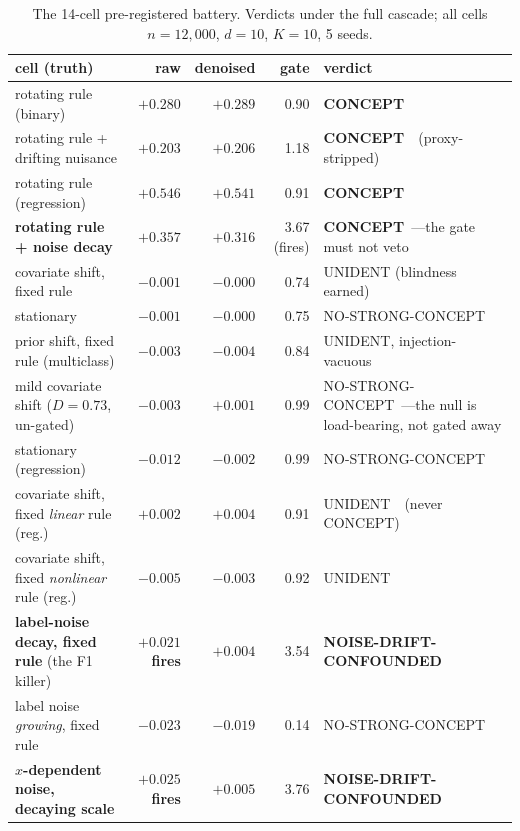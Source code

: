 \documentclass[10pt]{article} %
\newcommand{\yes}{\checkmark}
\begin{document}
\begin{table}[t]
\caption{The 14-cell pre-registered battery. Verdicts under the full cascade; all cells
$n = 12{,}000$, $d = 10$, $K = 10$, 5 seeds.}
\label{tab:battery}
\centering
\footnotesize
\setlength{\tabcolsep}{4pt}
\begin{tabular}{@{}>{\raggedright\arraybackslash}p{2.0in}rrr>{\raggedright\arraybackslash}p{2.35in}@{}}
\toprule
cell (truth) & raw & denoised & gate & verdict \\
\midrule
rotating rule (binary) & $+0.280$ & $+0.289$ & 0.90 & \textbf{CONCEPT}~\yes \\
rotating rule + drifting nuisance & $+0.203$ & $+0.206$ & 1.18 & \textbf{CONCEPT}~\yes\ (proxy-stripped) \\
rotating rule (regression) & $+0.546$ & $+0.541$ & 0.91 & \textbf{CONCEPT}~\yes \\
\textbf{rotating rule + noise decay} & $+0.357$ & $\boldsymbol{+0.316}$ & 3.67 (fires) & \textbf{CONCEPT}~\yes---the gate must not veto \\
covariate shift, fixed rule & $-0.001$ & $-0.000$ & 0.74 & UNIDENT (blindness earned)~\yes \\
stationary & $-0.001$ & $-0.000$ & 0.75 & NO-STRONG-CONCEPT~\yes \\
prior shift, fixed rule (multiclass) & $-0.003$ & $-0.004$ & 0.84 & UNIDENT, injection-vacuous~\yes \\
mild covariate shift ($D = 0.73$, un-gated) & $-0.003$ & $+0.001$ & 0.99 & NO-STRONG-CONCEPT~\yes---the null is load-bearing, not gated away \\
stationary (regression) & $-0.012$ & $-0.002$ & 0.99 & NO-STRONG-CONCEPT~\yes \\
covariate shift, fixed \emph{linear} rule (reg.) & $+0.002$ & $+0.004$ & 0.91 & UNIDENT~\yes\ (never CONCEPT) \\
covariate shift, fixed \emph{nonlinear} rule (reg.) & $-0.005$ & $-0.003$ & 0.92 & UNIDENT~\yes \\
\textbf{label-noise decay, fixed rule} (the F1 killer) & $\boldsymbol{+0.021}$ \textbf{fires} & $+0.004$ & 3.54 & \textbf{NOISE-DRIFT-CONFOUNDED}~\yes \\
label noise \emph{growing}, fixed rule & $-0.023$ & $-0.019$ & 0.14 & NO-STRONG-CONCEPT~\yes \\
\textbf{$x$-dependent noise, decaying scale} & $\boldsymbol{+0.025}$ \textbf{fires} & $+0.005$ & 3.76 & \textbf{NOISE-DRIFT-CONFOUNDED}~\yes \\
\bottomrule
\end{tabular}
\end{table}
\end{document}
